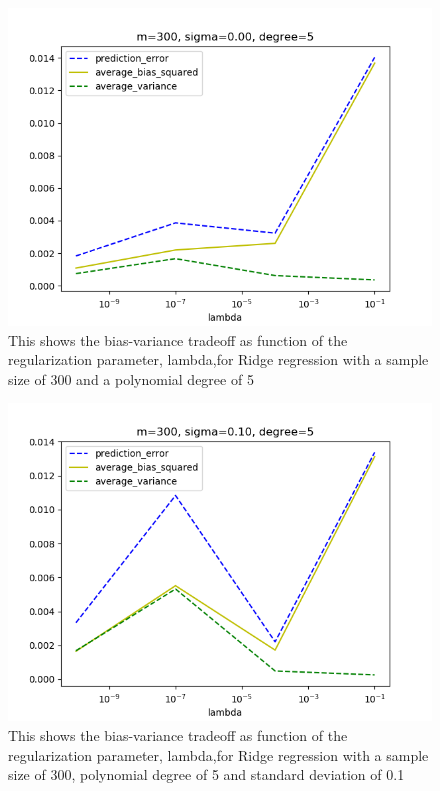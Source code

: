 \FloatBarrier
\begin{figure}[!ht]
	\centering
	\FloatBarrier
	\includegraphics[width=1\textwidth]{plot_ridge_without_r2/ridgeprediction_error_m300_d5_s0.png}
	
	\caption{This shows the bias-variance tradeoff as function of the regularization parameter, lambda,for Ridge regression with a sample size of 300 and a polynomial degree of 5}
	\label{fig:2}
\end{figure}
\FloatBarrier

\medskip


\FloatBarrier
\begin{figure}[!ht]
	\centering
	\FloatBarrier
	\includegraphics[width=1\textwidth]{plot_ridge_without_r2/ridgeprediction_error_m300_d5_s10.png}
	
	\caption{This shows the bias-variance tradeoff as function of the regularization parameter, lambda,for Ridge regression with a sample size of 300, polynomial degree of 5 and standard deviation of 0.1}
	\label{fig:2}
\end{figure}
\FloatBarrier

